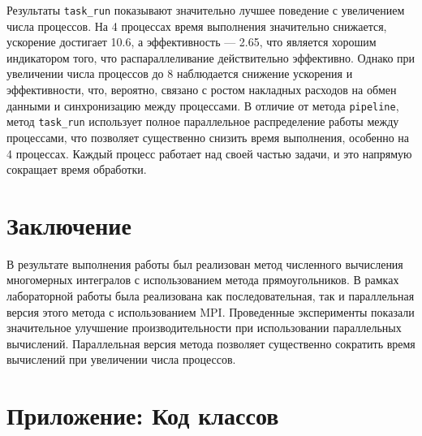 \documentclass[12pt]{article}
\begin{document}
\noindent Результаты \texttt{task\_run} показывают значительно лучшее поведение с увеличением числа процессов. На 4 процессах время выполнения значительно снижается, ускорение достигает 10.6, а эффективность — 2.65, что является хорошим индикатором того, что распараллеливание действительно эффективно. Однако при увеличении числа процессов до 8 наблюдается снижение ускорения и эффективности, что, вероятно, связано с ростом накладных расходов на обмен данными и синхронизацию между процессами. В отличие от метода \texttt{pipeline}, метод \texttt{task\_run} использует полное параллельное распределение работы между процессами, что позволяет существенно снизить время выполнения, особенно на 4 процессах. Каждый процесс работает над своей частью задачи, и это напрямую сокращает время обработки. 

\section*{Заключение}

В результате выполнения работы был реализован метод численного вычисления многомерных интегралов с использованием метода прямоугольников. В рамках лабораторной работы была реализована как последовательная, так и параллельная версия этого метода с использованием MPI. Проведенные эксперименты показали значительное улучшение производительности при использовании параллельных вычислений. Параллельная версия метода позволяет существенно сократить время вычислений при увеличении числа процессов.

\newpage
\section*{Приложение: Код классов}
\end{document}
